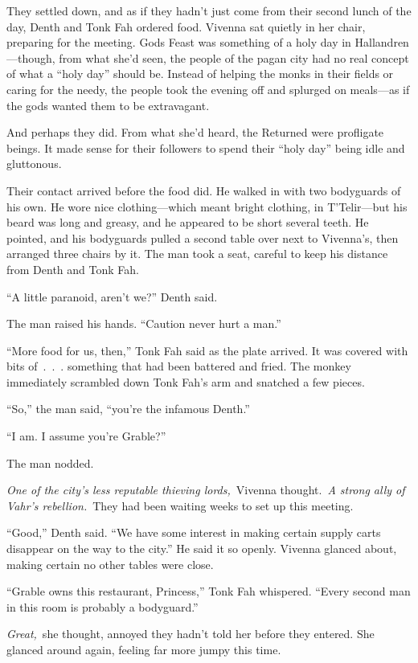 They settled down, and as if they hadn’t just come from their second lunch of the day, Denth and Tonk Fah ordered food. Vivenna sat quietly in her chair, preparing for the meeting. Gods Feast was something of a holy day in Hallandren—though, from what she’d seen, the people of the pagan city had no real concept of what a “holy day” should be. Instead of helping the monks in their fields or caring for the needy, the people took the evening off and splurged on meals—as if the gods wanted them to be extravagant.

And perhaps they did. From what she’d heard, the Returned were profligate beings. It made sense for their followers to spend their “holy day” being idle and gluttonous.

Their contact arrived before the food did. He walked in with two bodyguards of his own. He wore nice clothing—which meant bright clothing, in T’Telir—but his beard was long and greasy, and he appeared to be short several teeth. He pointed, and his bodyguards pulled a second table over next to Vivenna’s, then arranged three chairs by it. The man took a seat, careful to keep his distance from Denth and Tonk Fah.

“A little paranoid, aren’t we?” Denth said.

The man raised his hands. “Caution never hurt a man.”

“More food for us, then,” Tonk Fah said as the plate arrived. It was covered with bits of~.~.~. something that had been battered and fried. The monkey immediately scrambled down Tonk Fah’s arm and snatched a few pieces.

“So,” the man said, “you’re the infamous Denth.”

“I am. I assume you’re Grable?”

The man nodded.

\textit{One of the city’s less reputable thieving lords,}~Vivenna thought.~\textit{A strong ally of Vahr’s rebellion.}~They had been waiting weeks to set up this meeting.

“Good,” Denth said. “We have some interest in making certain supply carts disappear on the way to the city.” He said it so openly. Vivenna glanced about, making certain no other tables were close.

“Grable owns this restaurant, Princess,” Tonk Fah whispered. “Every second man in this room is probably a bodyguard.”

\textit{Great,}~she thought, annoyed they hadn’t told her before they entered. She glanced around again, feeling far more jumpy this time.

